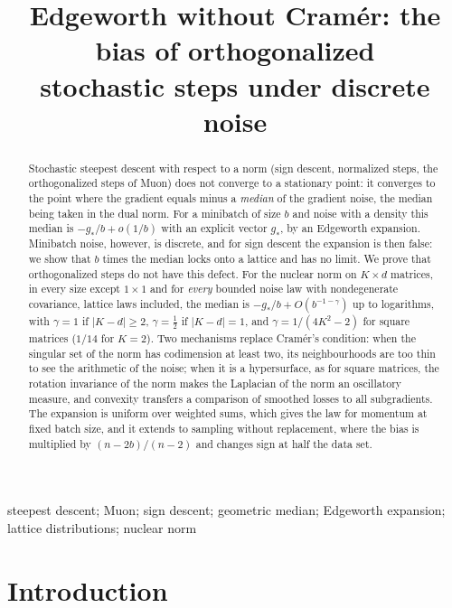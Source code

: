 \documentclass[anon,12pt]{colt2026}
\title[Edgeworth without Cram\'er for norm-steepest steps]{Edgeworth without Cram\'er: the bias of orthogonalized\\ stochastic steps under discrete noise}
\begin{document}
\maketitle

\begin{abstract}%
Stochastic steepest descent with respect to a norm (sign descent, normalized steps, the orthogonalized steps of Muon)
does not converge to a stationary point: it converges to the point where the gradient equals minus a \emph{median} of
the gradient noise, the median being taken in the dual norm. For a minibatch of size $b$ and noise with a density this
median is $-g_\ast/b+o(1/b)$ with an explicit vector $g_\ast$, by an Edgeworth expansion. Minibatch noise, however, is
discrete, and for sign descent the expansion is then false: we show that $b$ times the median locks onto a lattice and
has no limit. We prove that orthogonalized steps do not have this defect. For the nuclear norm on $K\times d$
matrices, in every size except $1\times1$ and for \emph{every} bounded noise law with nondegenerate covariance, lattice
laws included, the median is $-g_\ast/b+O(b^{-1-\gamma})$ up to logarithms, with $\gamma=1$ if $|K-d|\ge2$,
$\gamma=\frac12$ if $|K-d|=1$, and $\gamma=1/(4K^2-2)$ for square matrices ($1/14$ for $K=2$). Two mechanisms replace
Cram\'er's condition: when the singular set of the norm has codimension at least two, its neighbourhoods are too thin
to see the arithmetic of the noise; when it is a hypersurface, as for square matrices, the rotation invariance of the
norm makes the Laplacian of the norm an oscillatory measure, and convexity transfers a comparison of smoothed losses to
all subgradients. The expansion is uniform over weighted sums, which gives the law for momentum at fixed batch size, and
it extends to sampling without replacement, where the bias is multiplied by $(n-2b)/(n-2)$ and changes sign at
half the data set.
\end{abstract}
\begin{keywords}%
steepest descent; Muon; sign descent; geometric median; Edgeworth expansion; lattice distributions; nuclear norm
\end{keywords}

\section{Introduction}
\end{document}
